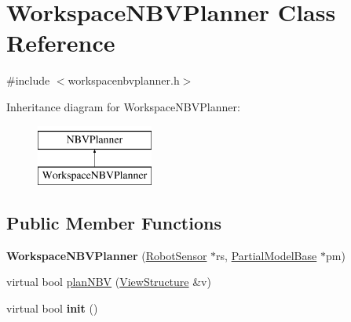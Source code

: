 \hypertarget{classWorkspaceNBVPlanner}{}\section{Workspace\+N\+B\+V\+Planner Class Reference}
\label{classWorkspaceNBVPlanner}


{\ttfamily \#include $<$workspacenbvplanner.\+h$>$}

Inheritance diagram for Workspace\+N\+B\+V\+Planner\+:\begin{figure}[H]
\begin{center}
\leavevmode
\includegraphics[height=2.000000cm]{classWorkspaceNBVPlanner}
\end{center}
\end{figure}
\subsection*{Public Member Functions}
\begin{DoxyCompactItemize}
\item 
{\bfseries Workspace\+N\+B\+V\+Planner} (\hyperlink{classRobotSensor}{Robot\+Sensor} $\ast$rs, \hyperlink{classPartialModelBase}{Partial\+Model\+Base} $\ast$pm)\hypertarget{classWorkspaceNBVPlanner_a8b29a06fc054a2bb59314b1a8b501068}{}\label{classWorkspaceNBVPlanner_a8b29a06fc054a2bb59314b1a8b501068}

\item 
virtual bool \hyperlink{classWorkspaceNBVPlanner_ad5655e5c1c45a017d4c598fd2632ed49}{plan\+N\+BV} (\hyperlink{classViewStructure}{View\+Structure} \&v)
\item 
virtual bool {\bfseries init} ()\hypertarget{classWorkspaceNBVPlanner_a8fc044565494abfd67a36c4565ca507d}{}\label{classWorkspaceNBVPlanner_a8fc044565494abfd67a36c4565ca507d}

\end{DoxyCompactItemize}
